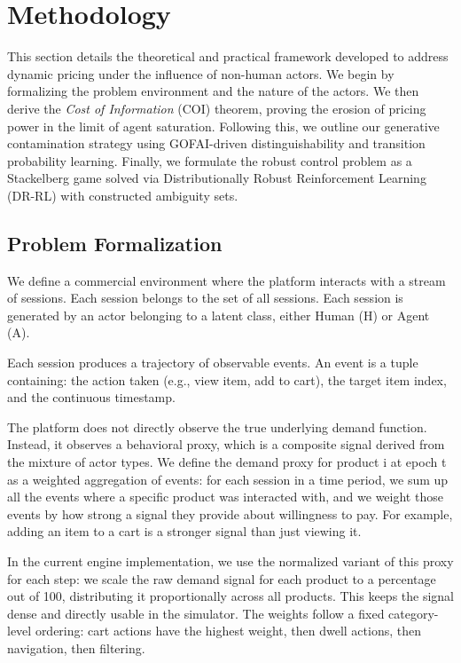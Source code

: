 \section{Methodology}

This section details the theoretical and practical framework developed to address dynamic pricing under the influence of non-human actors. We begin by formalizing the problem environment and the nature of the actors. We then derive the \textit{Cost of Information} (COI) theorem, proving the erosion of pricing power in the limit of agent saturation. Following this, we outline our generative contamination strategy using GOFAI-driven distinguishability and transition probability learning. Finally, we formulate the robust control problem as a Stackelberg game solved via Distributionally Robust Reinforcement Learning (DR-RL) with constructed ambiguity sets.

\subsection{Problem Formalization}

We define a commercial environment where the platform interacts with a stream of sessions. Each session belongs to the set of all sessions. Each session is generated by an actor belonging to a latent class, either Human (H) or Agent (A).

Each session produces a trajectory of observable events. An event is a tuple containing:
the action taken (e.g., view item, add to cart),
the target item index,
and the continuous timestamp.

The platform does not directly observe the true underlying demand function. Instead, it observes a behavioral proxy, which is a composite signal derived from the mixture of actor types. We define the demand proxy for product i at epoch t as a weighted aggregation of events: for each session in a time period, we sum up all the events where a specific product was interacted with, and we weight those events by how strong a signal they provide about willingness to pay. For example, adding an item to a cart is a stronger signal than just viewing it.

In the current engine implementation, we use the normalized variant of this proxy for each step: we scale the raw demand signal for each product to a percentage out of 100, distributing it proportionally across all products. This keeps the signal dense and directly usable in the simulator. The weights follow a fixed category-level ordering: cart actions have the highest weight, then dwell actions, then navigation, then filtering.

